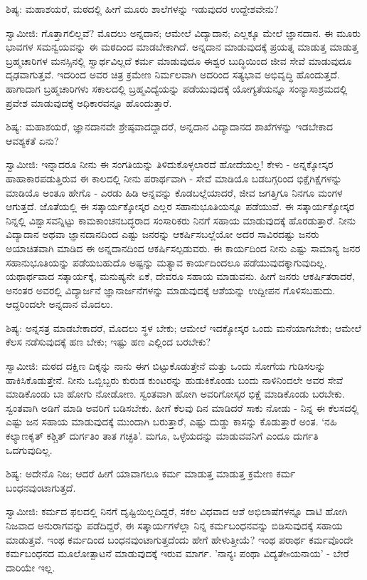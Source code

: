 ಶಿಷ್ಯ: ಮಹಾಶಯರೆ, ಮಠದಲ್ಲಿ ಹೀಗೆ ಮೂರು ಶಾಲೆಗಳನ್ನು ಇಡುವುದರ ಉದ್ದೇಶವೇನು?

ಸ್ವಾಮೀಜಿ: ಗೊತ್ತಾಗಲಿಲ್ಲವೆ? ಮೊದಲು ಅನ್ನದಾನ; ಆಮೇಲೆ ವಿದ್ಯಾದಾನ; ಎಲ್ಲಕ್ಕೂ ಮೇಲೆ ಜ್ಞಾನದಾನ. ಈ ಮೂರು ಭಾವಗಳ ಸಮನ್ವಯವನ್ನು ಈ ಮಠದಿಂದ ಮಾಡಬೇಕಾಗಿದೆ. ಅನ್ನದಾನ ಮಾಡುವುದಕ್ಕೆ ಪ್ರಯತ್ನ ಮಾಡುತ್ತ ಮಾಡುತ್ತ ಬ್ರಹ್ಮಚಾರಿಗಳ ಮನಸ್ಸಿನಲ್ಲಿ ಸ್ವಾರ್ಥವಿಲ್ಲದೆ ಕರ್ಮ ಮಾಡುವುದೂ ಈಶ್ವರ ಬುದ್ಧಿಯಿಂದ ಜೀವ ಸೇವೆ ಮಾಡುವುದೂ ದೃಢವಾಗುತ್ತವೆ. ಇದರಿಂದ ಅವರ ಚಿತ್ರ ಕ್ರಮೇಣ ನಿರ್ಮಲವಾಗಿ ಅದರಿಂದ ಸತ್ಯಭಾವ ಅಭಿವೃದ್ಧಿ ಹೊಂದುತ್ತದೆ. ಹಾಗಾದಾಗ ಬ್ರಹ್ಮಚಾರಿಗಳು ಸಕಾಲದಲ್ಲಿ ಬ್ರಹ್ಮವಿದ್ಯೆಯನ್ನು ಪಡೆಯುವುದಕ್ಕೆ ಯೋಗ್ಯತೆಯನ್ನೂ ಸಂನ್ಯಾಸಾಶ್ರಮದಲ್ಲಿ ಪ್ರವೇಶ ಮಾಡುವುದಕ್ಕೆ ಅಧಿಕಾರವನ್ನೂ ಹೊಂದುತ್ತಾರೆ.

ಶಿಷ್ಯ: ಮಹಾಶಯರೆ, ಜ್ಞಾನದಾನವೇ ಶ್ರೇಷ್ಠವಾದದ್ದಾದರೆ, ಅನ್ನದಾನ ವಿದ್ಯಾದಾನದ ಶಾಖೆಗಳನ್ನು ಇಡಬೇಕಾದ ಆವಶ್ಯಕತೆ ಏನು?

ಸ್ವಾಮೀಜಿ: ಇನ್ನಾದರೂ ನೀನು ಈ ಸಂಗತಿಯನ್ನು ತಿಳಿದುಕೊಳ್ಳಲಾರದೆ ಹೋದೆಯಲ್ಲ! ಕೇಳು - ಅನ್ನಕ್ಕೋಸ್ಕರ ಹಾಹಾಕಾರಪಡುತ್ತಿರುವ ಈ ಕಾಲದಲ್ಲಿ ನೀನು ಪರಾರ್ಥವಾಗಿ - ಸೇವೆ ಮಾಡಿಯೊ ಬಡಬಗ್ಗರಿಂದ ಭಿಕ್ಷೆಗಿಕ್ಷೆಗಳನ್ನು ಮಾಡಿಯೊ ಅಂತೂ ಹೇಗೊ - ಎರಡು ಹಿಡಿ ಅನ್ನವನ್ನು ಕೊಡಬಲ್ಲೆಯಾದರೆ, ಜೀವ ಜಗತ್ತಿಗೂ ನಿನಗೂ ಮಂಗಳ ಆಗುತ್ತದೆ. ಜೊತೆಯಲ್ಲಿ ಈ ಸತ್ಕಾರ್ಯಕ್ಕೋಸ್ಕರ ಎಲ್ಲರ ಸಹಾನುಭೂತಿಯನ್ನೂ ಪಡೆಯುವೆ. ಈ ಸತ್ಕಾರ್ಯಕ್ಕೋಸ್ಕರ ನಿನ್ನಲ್ಲಿ ವಿಶ್ವಾಸವನ್ನಿಟ್ಟು ಕಾಮಕಾಂಚನಬದ್ಧರಾದ ಸಂಸಾರಿಕರು ನಿನಗೆ ಸಹಾಯ ಮಾಡುವುದಕ್ಕೆ ಹೊರಡುತ್ತಾರೆ. ನೀನು ವಿದ್ಯಾದಾನ ಅಥವಾ ಜ್ಞಾನದಾನದಿಂದ ಎಷ್ಟು ಜನರನ್ನು ಆಕರ್ಷಿಸಬಲ್ಲೆಯೋ ಅದರ ಸಾವಿರದಷ್ಟು ಜನರು ಅಯಾಚಿತವಾಗಿ ಮಾಡಿದ ಈ ಅನ್ನದಾನದಿಂದ ಆಕರ್ಷಿಸಲ್ಪಡುವರು. ಈ ಕಾರ್ಯದಿಂದ ನೀನು ಎಷ್ಟು ಸಾಮಾನ್ಯ ಜನರ ಸಹಾನುಭೂತಿಯನ್ನು ಪಡೆಯಬಹುದೊ ಅಷ್ಟನ್ನು ಮತ್ಯಾವ ಕಾರ್ಯದಿಂದಲೂ ಪಡೆಯುವುದಕ್ಕಾಗುವುದಿಲ್ಲ. ಯಥಾರ್ಥವಾದ ಸತ್ಕಾರ್ಯಕ್ಕೆ, ಮನುಷ್ಯನೇ ಏಕೆ, ದೇವರೂ ಸಹಾಯ ಮಾಡುವನು. ಹೀಗೆ ಜನರು ಆಕರ್ಷಿತರಾದರೆ, ಅನಂತರ ಅವರಲ್ಲಿ ವಿದ್ಯಾರ್ಜನೆ ಜ್ಞಾನಾರ್ಜನೆಗಳನ್ನು ಮಾಡುವುದಕ್ಕೆ ಆಶೆಯನ್ನು ಉದ್ದೀಪನ ಗೊಳಿಸಬಹುದು. ಆದ್ದರಿಂದಲೇ ಅನ್ನದಾನ ಮೊದಲು.

ಶಿಷ್ಯ: ಅನ್ನಸತ್ರ ಮಾಡಬೇಕಾದರೆ, ಮೊದಲು ಸ್ಥಳ ಬೇಕು; ಆಮೇಲೆ ಇದಕ್ಕೋಸ್ಕರ ಒಂದು ಮನೆಯಾಗಬೇಕು; ಆಮೇಲೆ ಕೆಲಸ ನಡೆಸುವುದಕ್ಕೆ ಹಣ ಬೇಕು; ಇಷ್ಟು ಹಣ ಎಲ್ಲಿಂದ ಬರಬೇಕು?

ಸ್ವಾಮೀಜಿ: ಮಠದ ದಕ್ಷಿಣ ದಿಕ್ಕನ್ನು ನಾನು ಈಗ ಬಿಟ್ಟುಕೊಡುತ್ತೇನೆ ಮತ್ತು ಒಂದು ಸೋಗೆಯ ಗುಡಿಸಲನ್ನು ಹಾಕಿಸಿಕೊಡುತ್ತೇನೆ. ನೀನು ಒಬ್ಬಿಬ್ಬರು ಕುರುಡ ಕುಂಟರನ್ನು ಹುಡುಕಿಕೊಂಡು ಬಂದು ನಾಳಿನಿಂದಲೇ ಅವರ ಸೇವೆ ಮಾಡಿಕೊಂಡು ಬಾ ಹೋಗು ನೋಡೋಣ. ಸ್ವಂತವಾಗಿ ಹೋಗಿ ಅವರಿಗೋಸ್ಕರ ಭಿಕ್ಷೆ ಮಾಡಿಕೊಂಡು ಬರಬೇಕು. ಸ್ವಂತವಾಗಿ ಅಡಿಗೆ ಮಾಡಿ ಅವರಿಗೆ ಬಡಿಸಬೇಕು. ಹೀಗೆ ಕೆಲವು ದಿನ ಮಾಡಿದರೆ ಸಾಕು ನೋಡು - ನಿನ್ನ ಈ ಕೆಲಸದಲ್ಲಿ ಎಷ್ಟು ಜನ ಸಹಾಯ ಮಾಡುವುದಕ್ಕೆ ಮುಂದಾಗಿ ಬರುತ್ತಾರೆ, ಎಷ್ಟು ದುಡ್ಡು ಕಾಸನ್ನು ಕೊಡುತ್ತಾರೆ ಅಂತ. ‘ನಹಿ ಕಲ್ಯಾಣಕೃತ್ ಕಶ್ಚಿತ್ ದುರ್ಗತಿಂ ತಾತ ಗಚ್ಛತಿ’. ಮಗೂ, ಒಳ್ಳೆಯದನ್ನು ಮಾಡುವವನಿಗೆ ಎಂದೂ ದುರ್ಗತಿ ಒದಗುವುದಿಲ್ಲ.

ಶಿಷ್ಯ: ಅದೇನೊ ನಿಜ; ಆದರೆ ಹೀಗೆ ಯಾವಾಗಲೂ ಕರ್ಮ ಮಾಡುತ್ತ ಮಾಡುತ್ತ ಕ್ರಮೇಣ ಕರ್ಮ ಬಂಧನವುಂಟಾಗುತ್ತದೆ.

ಸ್ವಾಮೀಜಿ: ಕರ್ಮದ ಫಲದಲ್ಲಿ ನಿನಗೆ ದೃಷ್ಟಿಯಿಲ್ಲದಿದ್ದರೆ, ಸಕಲ ವಿಧವಾದ ಆಶೆ ಅಭಿಲಾಷೆಗಳನ್ನೂ ದಾಟಿ ಹೋಗಿ ನಿಜವಾದ ಅನುರಾಗವನ್ನು ಪಡೆದಿದ್ದರೆ, ಈ ಸತ್ಕಾರ್ಯಗಳೆಲ್ಲಾ ನಿನ್ನ ಕರ್ಮಬಂಧನವನ್ನು ಬಿಡಿಸುವುದಕ್ಕೆ ಸಹಾಯ ಮಾಡುತ್ತವೆ. ಇಂಥ ಕರ್ಮದಿಂದ ಬಂಧನವುಂಟಾಗುತ್ತದೆಂದು ಹೇಗೆ ಹೇಳುತ್ತೀಯೆ? ಇಂಥ ಪರಾರ್ಥ ಕರ್ಮವೊಂದೇ ಕರ್ಮಬಂಧನದ ಮೂಲೋತ್ಪಾಟನೆ ಮಾಡುವುದಕ್ಕೆ ಇರುವ ಮಾರ್ಗ. 'ನಾನ್ಯಃ ಪಂಥಾ ವಿದ್ಯತೇsಯನಾಯ' - ಬೇರೆ ದಾರಿಯೇ ಇಲ್ಲ.

